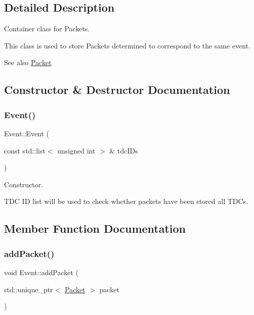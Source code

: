 \subsection{Detailed Description}
Container class for Packets. 

This class is used to store Packets determined to correspond to the same event.

\begin{DoxySeeAlso}{See also}
\hyperlink{class_packet}{Packet} 
\end{DoxySeeAlso}


\subsection{Constructor \& Destructor Documentation}
\mbox{\label{class_event_a6e0319cd5e7b0e8b232e3c829c2ad00c}} 
\subsubsection{\texorpdfstring{Event()}{Event()}}
{\footnotesize\ttfamily Event\+::\+Event (\begin{DoxyParamCaption}\item[{const std\+::list$<$ unsigned int $>$ \&}]{tdc\+I\+Ds }\end{DoxyParamCaption})}



Constructor. 

T\+DC ID list will be used to check whether packets have been stored all T\+D\+Cs. 

\subsection{Member Function Documentation}
\mbox{\label{class_event_a08c4689086126f702d3b14be99461c98}} 
\subsubsection{\texorpdfstring{add\+Packet()}{addPacket()}}
{\footnotesize\ttfamily void Event\+::add\+Packet (\begin{DoxyParamCaption}\item[{std\+::unique\+\_\+ptr$<$ \hyperlink{class_packet}{Packet} $>$}]{packet }\end{DoxyParamCaption})}



